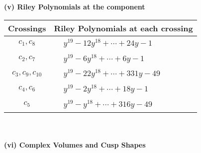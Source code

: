 \documentclass[1p]{elsarticle_modified}
\theoremstyle{definition}
\begin{document}
\newpage\renewcommand{\arraystretch}{1}
\flushleft \textbf{(v) Riley Polynomials at the component}\newline \\
\begin{tabular}{m{50pt}|m{274pt}}
Crossings & \hspace{64pt}Riley Polynomials at each crossing \\
\hline $$\begin{aligned}c_{1},c_{8}\end{aligned}$$&$\begin{aligned}
&y^{19}-12 y^{18}+\cdots+24 y-1
\end{aligned}$\\
\hline $$\begin{aligned}c_{2},c_{7}\end{aligned}$$&$\begin{aligned}
&y^{19}-6 y^{18}+\cdots+6 y-1
\end{aligned}$\\
\hline $$\begin{aligned}c_{3},c_{9},c_{10}\end{aligned}$$&$\begin{aligned}
&y^{19}-22 y^{18}+\cdots+331 y-49
\end{aligned}$\\
\hline $$\begin{aligned}c_{4},c_{6}\end{aligned}$$&$\begin{aligned}
&y^{19}-2 y^{18}+\cdots+18 y-1
\end{aligned}$\\
\hline $$\begin{aligned}c_{5}\end{aligned}$$&$\begin{aligned}
&y^{19}- y^{18}+\cdots+316 y-49
\end{aligned}$\\
\hline
\end{tabular}\\~\\
\newpage\flushleft \textbf{(vi) Complex Volumes and Cusp Shapes}
\end{document}
